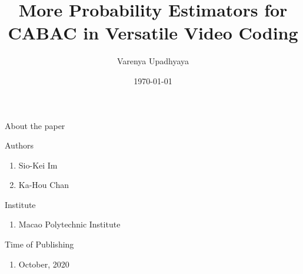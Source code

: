 \documentclass{beamer}
\title{More Probability Estimators for CABAC in Versatile Video Coding}
\author{Varenya Upadhyaya}
\institute{IITH}
\date{\today}
\begin{document}
\begin{frame}
\titlepage
\end{frame}
\begin{frame}{About the paper}
\begin{block}{Authors}
    \begin{enumerate}[]
        \item Sio-Kei Im
        \item Ka-Hou Chan
    \end{enumerate}
\end{block}

\begin{block}{Institute}
\begin{enumerate}[]
    \item Macao Polytechnic Institute %
\end{enumerate}
\end{block}

\begin{block}{Time of Publishing}
\begin{enumerate}[]
    \item October, 2020
\end{enumerate} 
\end{block}
\end{frame}
\end{document}
